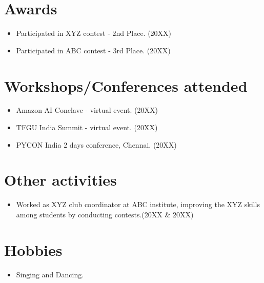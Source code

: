 \documentclass[letterpaper]{twentysecondcv} %
\begin{document}





\section{Awards}
\begin{itemize}
\item Participated in XYZ contest - 2nd Place.  \hfill(20XX)
\item Participated in ABC contest - 3rd Place.  \hfill(20XX)
\end{itemize}

\section{Workshops/Conferences attended}

\begin{itemize}
\item Amazon AI Conclave - virtual event. \hfill(20XX)
\item TFGU India Summit - virtual event. \hfill(20XX)
\item {PYCON India 2 days conference, Chennai.} \hfill(20XX)
 
\end{itemize}

\section{Other activities}


\begin{itemize}
\item Worked as XYZ club coordinator at ABC institute, improving the XYZ skills among students by conducting contests.\hfill(20XX \& 20XX)

\end{itemize}

\section{Hobbies}
\begin{itemize}
\item Singing and Dancing.
\end{itemize}
\end{document}
